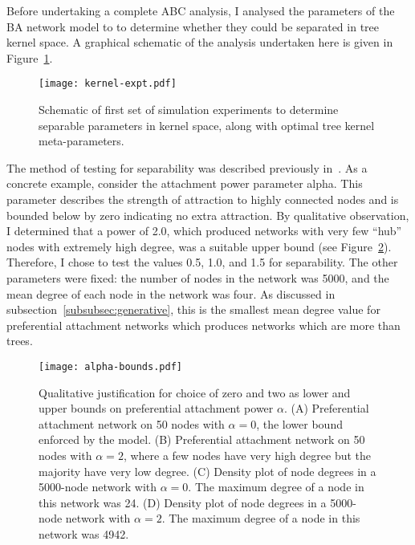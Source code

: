 Before undertaking a complete ABC analysis, I analysed the parameters of the
\gls{BA} network model to to determine whether they could be separated in tree
kernel space. A graphical schematic of the analysis undertaken here is given in
Figure~\ref{fig:kernelexpt}.

\begin{figure}[ht]
  \centering
  \label{fig:kernelexpt}
  \texttt{[image: kernel-expt.pdf]}
  \caption[Schematic of first set of simulation experiments]{
    Schematic of first set of simulation experiments to determine separable
    parameters in kernel space, along with optimal tree kernel meta-parameters.
  }
\end{figure}

The method of testing for separability was described previously
in~\autocite{poon2015phylodynamic}. As a concrete example, consider the
attachment power parameter \gls{alpha}. This parameter describes the strength
of attraction to highly connected nodes and is bounded below by zero indicating
no extra attraction. By qualitative observation, I determined that a power of
2.0, which produced networks with very few ``hub'' nodes with extremely high
degree, was a suitable upper bound (see Figure~\ref{fig:alphabds}). Therefore,
I chose to test the values 0.5, 1.0, and 1.5 for separability. The other
parameters were fixed: the number of nodes in the network was 5000, and the
mean degree of each node in the network was four. As discussed in
subsection~\ref{subsubsec:generative}, this is the smallest mean degree value
for preferential attachment networks which produces networks which are more
than trees. 

\begin{figure}[ht]
  \centering
  \label{fig:alphabds}
  \texttt{[image: alpha-bounds.pdf]}
  \caption[Upper and lower bounds on preferential attachment power]{
    Qualitative justification for choice of zero and two as lower and upper
    bounds on preferential attachment power $\alpha$. (A) Preferential
    attachment network on 50 nodes with $\alpha = 0$, the lower bound enforced
    by the model. (B) Preferential attachment network on 50 nodes with $\alpha
    = 2$, where a few nodes have very high degree but the majority have very
    low degree. (C) Density plot of node degrees in a 5000-node network with
    $\alpha = 0$. The maximum degree of a node in this network was 24. (D)
    Density plot of node degrees in a 5000-node network with $\alpha = 2$. The
    maximum degree of a node in this network was 4942. 
  }
\end{figure}

